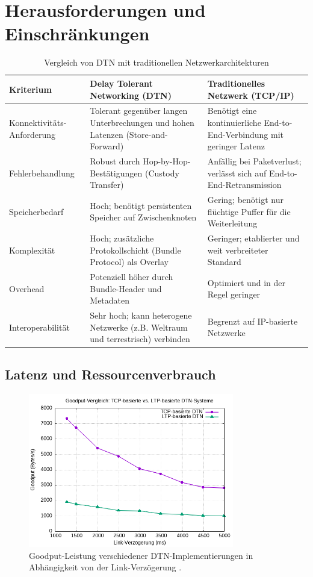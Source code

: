 \documentclass[paper=a4,fontsize=12pt,ngerman]{scrartcl}
\begin{document}
\section{Herausforderungen und Einschränkungen}
\begin{table}[H]
\centering
\begin{tabular}{|p{4cm}|p{5.5cm}|p{5.5cm}|}
\hline
\textbf{Kriterium} & \textbf{Delay Tolerant Networking (DTN)} & \textbf{Traditionelles Netzwerk (TCP/IP)} \\
\hline
Konnektivitäts-Anforderung & Tolerant gegenüber langen Unterbrechungen und hohen Latenzen (Store-and-Forward) & Benötigt eine kontinuierliche End-to-End-Verbindung mit geringer Latenz \\
\hline
Fehlerbehandlung & Robust durch Hop-by-Hop-Bestätigungen (Custody Transfer) & Anfällig bei Paketverlust; verlässt sich auf End-to-End-Retransmission \\
\hline
Speicherbedarf & Hoch; benötigt persistenten Speicher auf Zwischenknoten & Gering; benötigt nur flüchtige Puffer für die Weiterleitung \\
\hline
Komplexität & Hoch; zusätzliche Protokollschicht (Bundle Protocol) als Overlay & Geringer; etablierter und weit verbreiteter Standard \\
\hline
Overhead & Potenziell höher durch Bundle-Header und Metadaten & Optimiert und in der Regel geringer \\
\hline
Interoperabilität & Sehr hoch; kann heterogene Netzwerke (z.B. Weltraum und terrestrisch) verbinden & Begrenzt auf IP-basierte Netzwerke \\
\hline
\end{tabular}
\caption{Vergleich von DTN mit traditionellen Netzwerkarchitekturen \cite{CBH+07,Fall03}}
\label{tab:dtn_vs_tcpip}
\end{table}


\subsection{Latenz und Ressourcenverbrauch}
\begin{figure}[h!]
\centering
\includegraphics[width=0.8\textwidth]{graphics/dtn_goodput.png}
\caption{Goodput-Leistung verschiedener DTN-Implementierungen in Abhängigkeit von der Link-Verzögerung \cite[S. 5-6]{WaWa25}.}
\label{fig:dtn_goodput}
\end{figure}
\end{document}
